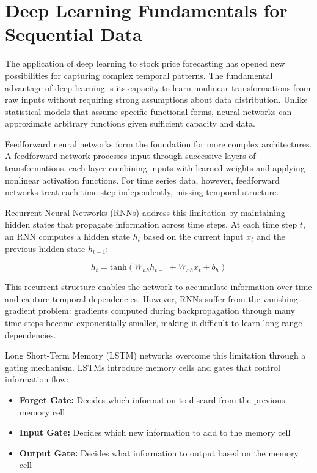 \section{Deep Learning Fundamentals for Sequential Data}

The application of deep learning to stock price forecasting has opened new possibilities for capturing complex temporal patterns. The fundamental advantage of deep learning is its capacity to learn nonlinear transformations from raw inputs without requiring strong assumptions about data distribution. Unlike statistical models that assume specific functional forms, neural networks can approximate arbitrary functions given sufficient capacity and data.

Feedforward neural networks form the foundation for more complex architectures. A feedforward network processes input through successive layers of transformations, each layer combining inputs with learned weights and applying nonlinear activation functions. For time series data, however, feedforward networks treat each time step independently, missing temporal structure.

Recurrent Neural Networks (RNNs) address this limitation by maintaining hidden states that propagate information across time steps. At each time step $t$, an RNN computes a hidden state $h_t$ based on the current input $x_t$ and the previous hidden state $h_{t-1}$:

$$h_t = \text{tanh}(W_{hh} h_{t-1} + W_{xh} x_t + b_h)$$

This recurrent structure enables the network to accumulate information over time and capture temporal dependencies. However, RNNs suffer from the vanishing gradient problem: gradients computed during backpropagation through many time steps become exponentially smaller, making it difficult to learn long-range dependencies.

Long Short-Term Memory (LSTM) networks overcome this limitation through a gating mechanism. LSTMs introduce memory cells and gates that control information flow:

\begin{itemize}
    \item \textbf{Forget Gate:} Decides which information to discard from the previous memory cell
    \item \textbf{Input Gate:} Decides which new information to add to the memory cell
    \item \textbf{Output Gate:} Decides what information to output based on the memory cell
\end{itemize}

